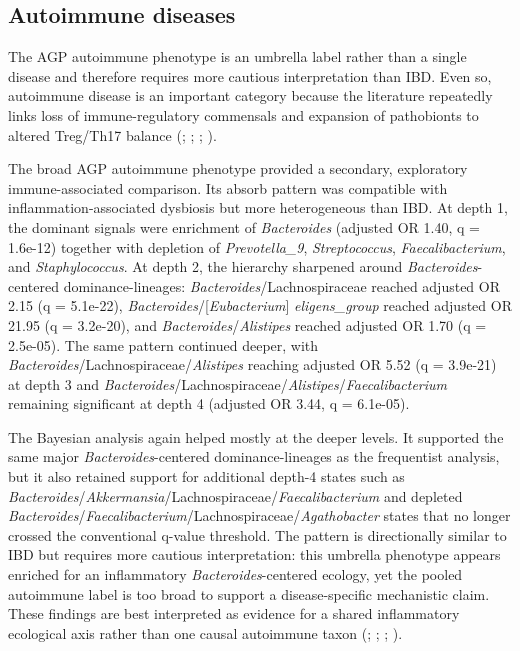 \documentclass[
  11pt,
]{article}
\newcommand{\taxon}[1]{\emph{#1}}
\begin{document}
\subsection{Autoimmune diseases}\label{autoimmune-diseases}


The AGP autoimmune phenotype is an umbrella label rather than a single
disease and therefore requires more cautious interpretation than IBD.
Even so,
autoimmune disease is an important category because the literature
repeatedly links loss of immune-regulatory commensals and expansion of
pathobionts to altered Treg/Th17 balance
(;
;
;
).

The broad AGP autoimmune phenotype provided a secondary, exploratory
immune-associated comparison. Its absorb pattern was compatible with
inflammation-associated dysbiosis but more heterogeneous than IBD. At depth 1, the dominant
signals were enrichment of \taxon{Bacteroides} (adjusted OR 1.40, q =
1.6e-12) together with depletion of \taxon{Prevotella\_9},
\taxon{Streptococcus}, \taxon{Faecalibacterium}, and
\taxon{Staphylococcus}. At depth 2, the hierarchy sharpened around
\taxon{Bacteroides}-centered dominance-lineages:
\taxon{Bacteroides}/Lachnospiraceae reached adjusted OR 2.15 (q =
5.1e-22), \taxon{Bacteroides}/[\emph{Eubacterium}]
\emph{eligens\_group} reached adjusted OR 21.95 (q = 3.2e-20), and
\taxon{Bacteroides}/\taxon{Alistipes} reached adjusted OR 1.70 (q =
2.5e-05). The same pattern continued deeper, with
\taxon{Bacteroides}/Lachnospiraceae/\taxon{Alistipes} reaching adjusted
OR 5.52 (q = 3.9e-21) at depth 3 and
\taxon{Bacteroides}/Lachnospiraceae/\taxon{Alistipes}/\taxon{Faecalibacterium}
remaining significant at depth 4 (adjusted OR 3.44, q = 6.1e-05).

The Bayesian analysis again helped mostly at the deeper levels. It
supported the same major \taxon{Bacteroides}-centered dominance-lineages as the
frequentist analysis, but it also retained support for additional depth-4
states such as
\taxon{Bacteroides}/\taxon{Akkermansia}/Lachnospiraceae/\taxon{Faecalibacterium}
and depleted
\taxon{Bacteroides}/\taxon{Faecalibacterium}/Lachnospiraceae/\taxon{Agathobacter}
states that no longer crossed the conventional q-value threshold. The
pattern is directionally similar to IBD but requires more cautious
interpretation: this umbrella phenotype appears enriched for an
inflammatory \taxon{Bacteroides}-centered ecology, yet the pooled
autoimmune label is too broad to support a disease-specific mechanistic
claim. These findings are best interpreted as evidence for a shared
inflammatory ecological axis rather than one causal autoimmune taxon
(;
;
;
).
\end{document}
